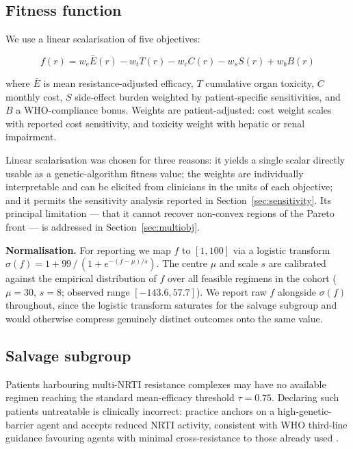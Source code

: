 \documentclass[conference]{IEEEtran}
\begin{document}
\subsection{Fitness function}\label{sec:fitness}

We use a linear scalarisation of five objectives:

$$f(r) = w_e \bar{E}(r) - w_t T(r) - w_c C(r) - w_s S(r) + w_b B(r)$$

where $\bar{E}$ is mean resistance-adjusted efficacy, $T$ cumulative organ toxicity, $C$ monthly cost, $S$ side-effect burden weighted by patient-specific sensitivities, and $B$ a WHO-compliance bonus. Weights are patient-adjusted: cost weight scales with reported cost sensitivity, and toxicity weight with hepatic or renal impairment.

Linear scalarisation was chosen for three reasons: it yields a single scalar directly usable as a genetic-algorithm fitness value; the weights are individually interpretable and can be elicited from clinicians in the units of each objective; and it permits the sensitivity analysis reported in Section~\ref{sec:sensitivity}. Its principal limitation --- that it cannot recover non-convex regions of the Pareto front --- is addressed in Section~\ref{sec:multiobj}.

\textbf{Normalisation.} For reporting we map $f$ to $[1, 100]$ via a logistic transform $\sigma(f) = 1 + 99 \, / \, (1 + e^{-(f - \mu)/s})$. The centre $\mu$ and scale $s$ are calibrated against the empirical distribution of $f$ over all feasible regimens in the cohort ($\mu = 30$, $s = 8$; observed range $[-143.6, 57.7]$). We report raw $f$ alongside $\sigma(f)$ throughout, since the logistic transform saturates for the salvage subgroup and would otherwise compress genuinely distinct outcomes onto the same value.

\subsection{Salvage subgroup}\label{sec:salvage-method}

Patients harbouring multi-NRTI resistance complexes may have no available regimen reaching the standard mean-efficacy threshold $\tau = 0.75$. Declaring such patients untreatable is clinically incorrect: practice anchors on a high-genetic-barrier agent and accepts reduced NRTI activity, consistent with WHO third-line guidance favouring agents with minimal cross-resistance to those already used \cite{who2021consolidated}.
\end{document}
